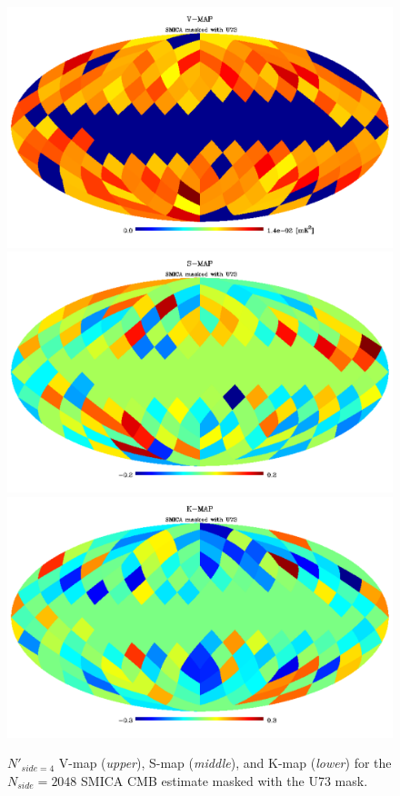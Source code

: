 \begin{figure}
\centering
\includegraphics[scale=0.3]{figures/chapter-vsk/vmap.pdf}\\
\includegraphics[scale=0.3]{figures/chapter-vsk/smap.pdf}\\
\includegraphics[scale=0.3]{figures/chapter-vsk/kmap.pdf}
\caption{$N'_{side = 4}$ V-map (\textit{upper}), S-map (\textit{middle}), and K-map (\textit{lower}) for the $N_{side} = 2048$ SMICA CMB estimate masked with the U73 mask.}
\label{Fig:3}
\end{figure}

